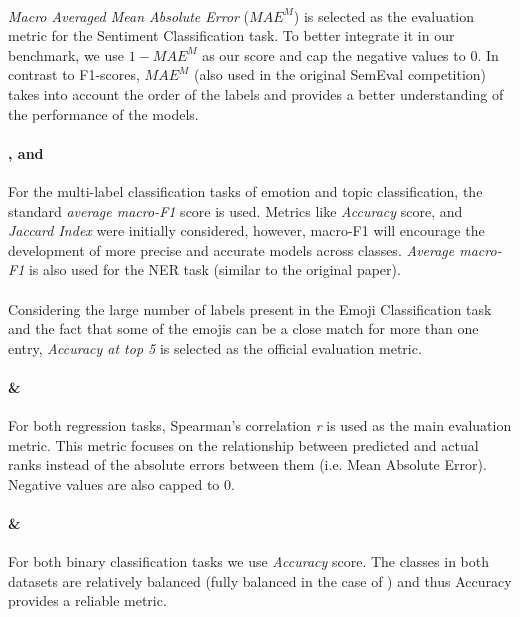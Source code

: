 \paragraph{{\TweetSentiment}} \textit{Macro Averaged Mean Absolute Error} ($MAE^M$) \cite{baccianella2009evaluation} is selected as the evaluation metric for the Sentiment Classification task. To better integrate it in our benchmark, we use $1 - MAE^M$ as our score and cap the negative values to 0. In contrast to F1-scores, $MAE^M$ (also used in the original SemEval competition) takes into account the order of the labels and provides a better understanding of the performance of the models. 

\paragraph{{\TweetEmotion}, {\TweetTopic} and {\TweetNER}} For the multi-label classification tasks of emotion and topic classification, the standard \textit{average macro-F1} score is used. Metrics like \textit{Accuracy} score, and \textit{Jaccard Index} were initially considered, however, macro-F1 will encourage the development of more precise and accurate models across classes. \textit{Average macro-F1} is also used for the NER task (similar to the {\TweetNER} original paper).

\paragraph{{\TweetEmoji}} Considering the large number of labels present in the Emoji Classification task and  the fact that some of the emojis can be a close match for more than one entry, \textit{Accuracy at top 5} is selected as the official evaluation metric. 

\paragraph{{\TweetSimilarity} \& {\TweetIntimacy}} For both regression tasks, Spearman's correlation \textit{r} is used as the main evaluation metric. This metric focuses on the relationship between predicted and actual ranks instead of the absolute errors between them (i.e. Mean Absolute Error). Negative values are also capped to 0.

\paragraph{{\TweetNERD} \& {\TempoWiC}} For both binary classification tasks we use \textit{Accuracy} score. The classes in both datasets are relatively balanced (fully balanced in the case of {\TweetNERD}) and thus Accuracy provides a reliable metric.

